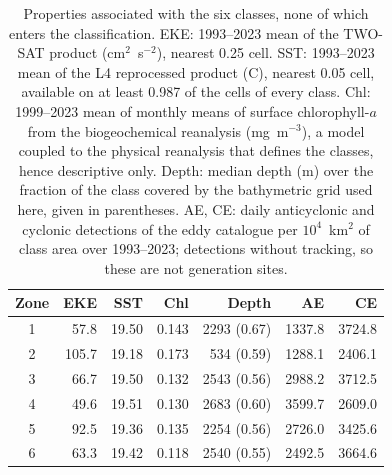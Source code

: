 \begin{table}[htbp]
\centering
\small
\caption{Properties associated with the six classes, none of which enters the classification. EKE: 1993--2023 mean of the TWO-SAT product (cm$^{2}$~s$^{-2}$), nearest 0.25\textdegree{} cell. SST: 1993--2023 mean of the L4 reprocessed product (\textdegree C), nearest 0.05\textdegree{} cell, available on at least 0.987 of the cells of every class. Chl: 1999--2023 mean of monthly means of surface chlorophyll-$a$ from the biogeochemical reanalysis (mg~m$^{-3}$), a model coupled to the physical reanalysis that defines the classes, hence descriptive only. Depth: median depth (m) over the fraction of the class covered by the bathymetric grid used here, given in parentheses. AE, CE: daily anticyclonic and cyclonic detections of the eddy catalogue per $10^{4}$~km$^{2}$ of class area over 1993--2023; detections without tracking, so these are not generation sites.}
\label{tab:zones-properties}
\begin{tabular}{crrrrrr}
\toprule
Zone & EKE & SST & Chl & Depth & AE & CE \\
\midrule
1 & 57.8 & 19.50 & 0.143 & 2293 (0.67) & 1337.8 & 3724.8 \\
2 & 105.7 & 19.18 & 0.173 & 534 (0.59) & 1288.1 & 2406.1 \\
3 & 66.7 & 19.50 & 0.132 & 2543 (0.56) & 2988.2 & 3712.5 \\
4 & 49.6 & 19.51 & 0.130 & 2683 (0.60) & 3599.7 & 2609.0 \\
5 & 92.5 & 19.36 & 0.135 & 2254 (0.56) & 2726.0 & 3425.6 \\
6 & 63.3 & 19.42 & 0.118 & 2540 (0.55) & 2492.5 & 3664.6 \\
\bottomrule
\end{tabular}
\end{table}

